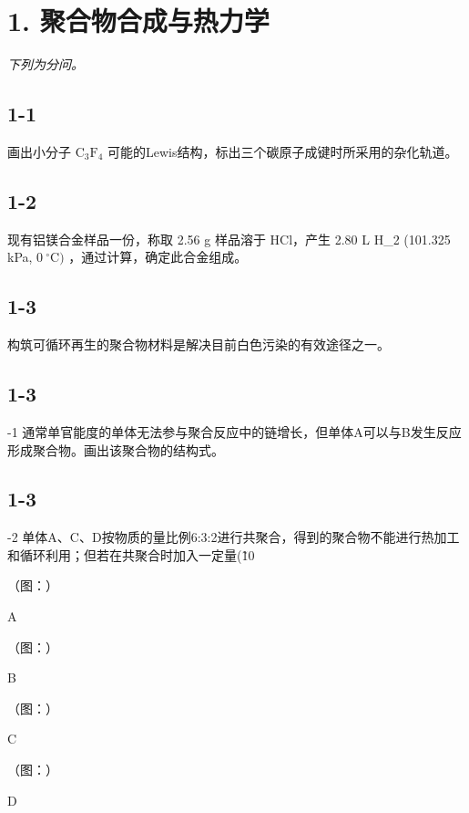 \section*{1. 聚合物合成与热力学}
\textit{下列为分问。}

\subsection*{1-1}
画出⼩分⼦ $\mathrm { C _ { 3 } F _ { 4 } }$ 可能的Lewis结构，标出三个碳原⼦成键时所采⽤的杂化轨道。

\subsection*{1-2}
现有铝镁合⾦样品⼀份，称取 2.56 g 样品溶于 HCl，产⽣ 2.80 L H_{2} (101.325 kPa, $0 ~ ^ { \circ } \mathrm { C } )$ ，通过计算，确定此合⾦组成。

\subsection*{1-3}
构筑可循环再⽣的聚合物材料是解决⽬前⽩⾊污染的有效途径之⼀。

\subsection*{1-3}
-1 通常单官能度的单体⽆法参与聚合反应中的链增⻓，但单体A可以与B发⽣反应形成聚合物。画出该聚合物的结构式。

\subsection*{1-3}
-2 单体A、C、D按物质的量⽐例6:3:2进⾏共聚合，得到的聚合物不能进⾏热加⼯和循环利⽤；但若在共聚合时加⼊⼀定量(\~10%

（图：）

A

（图：）

B

（图：）

C

（图：）

D
